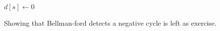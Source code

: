   \begin{algorithm}[h]
    $d[s] \leftarrow 0 $\\

    \caption{Bellman–Ford.}
    \label{alg:bellman-ford}
  \end{algorithm}


  Showing that Bellman-ford detects a negative cycle is left as exercise.  





